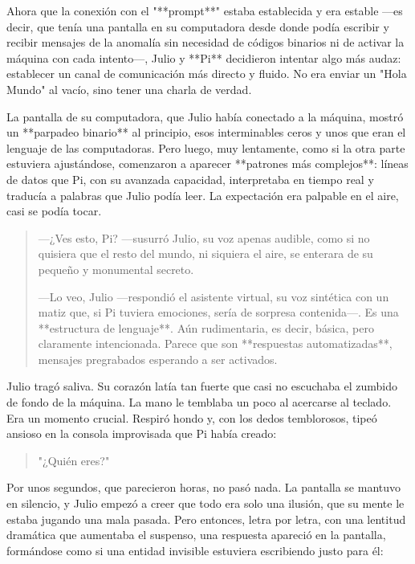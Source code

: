 \documentclass[a4paper,12pt]{book}
\begin{document}
Ahora que la conexión con el "**prompt**" estaba establecida y era estable —es decir, que tenía una pantalla en su computadora desde donde podía escribir y recibir mensajes de la anomalía sin necesidad de códigos binarios ni de activar la máquina con cada intento—, Julio y **Pi** decidieron intentar algo más audaz: establecer un canal de comunicación más directo y fluido. No era enviar un "Hola Mundo" al vacío, sino tener una charla de verdad.

La pantalla de su computadora, que Julio había conectado a la máquina, mostró un **parpadeo binario** al principio, esos interminables ceros y unos que eran el lenguaje de las computadoras. Pero luego, muy lentamente, como si la otra parte estuviera ajustándose, comenzaron a aparecer **patrones más complejos**: líneas de datos que Pi, con su avanzada capacidad, interpretaba en tiempo real y traducía a palabras que Julio podía leer. La expectación era palpable en el aire, casi se podía tocar.

\begin{quote}
    —¿Ves esto, Pi? —susurró Julio, su voz apenas audible, como si no quisiera que el resto del mundo, ni siquiera el aire, se enterara de su pequeño y monumental secreto.

    —Lo veo, Julio —respondió el asistente virtual, su voz sintética con un matiz que, si Pi tuviera emociones, sería de sorpresa contenida—. Es una **estructura de lenguaje**. Aún rudimentaria, es decir, básica, pero claramente intencionada. Parece que son **respuestas automatizadas**, mensajes pregrabados esperando a ser activados.
\end{quote}

Julio tragó saliva. Su corazón latía tan fuerte que casi no escuchaba el zumbido de fondo de la máquina. La mano le temblaba un poco al acercarse al teclado. Era un momento crucial. Respiró hondo y, con los dedos temblorosos, tipeó ansioso en la consola improvisada que Pi había creado:

\begin{quote}
    "¿Quién eres?"
\end{quote}

Por unos segundos, que parecieron horas, no pasó nada. La pantalla se mantuvo en silencio, y Julio empezó a creer que todo era solo una ilusión, que su mente le estaba jugando una mala pasada. Pero entonces, letra por letra, con una lentitud dramática que aumentaba el suspenso, una respuesta apareció en la pantalla, formándose como si una entidad invisible estuviera escribiendo justo para él:
\end{document}

